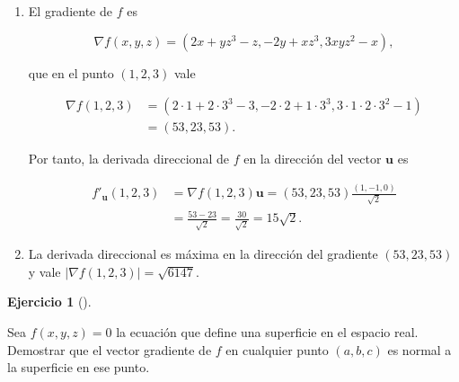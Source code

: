 \documentclass[
  spanish,
  a4paper,
]{scrreport}
\theoremstyle{definition}
\newtheorem{exercise}{Ejercicio}[chapter]
\theoremstyle{remark}
\begin{document}
\begin{tcolorbox}[enhanced jigsaw, arc=.35mm, bottomrule=.15mm, bottomtitle=1mm, breakable, colback=white, colbacktitle=quarto-callout-tip-color!10!white, colframe=quarto-callout-tip-color-frame, coltitle=black, left=2mm, leftrule=.75mm, opacityback=0, opacitybacktitle=0.6, rightrule=.15mm, title=\textcolor{quarto-callout-tip-color}{\faLightbulb}\hspace{0.5em}{Solución}, titlerule=0mm, toprule=.15mm, toptitle=1mm]

\begin{enumerate}
\def\labelenumi{\alph{enumi}.}
\item
  El gradiente de \(f\) es

  \[
  \nabla f(x,y,z) = (2x+yz^3-z, -2y+xz^3, 3xyz^2-x),
  \]

  que en el punto \((1, 2, 3)\) vale

  \begin{align*}
  \nabla f(1,2,3) 
  &= (2\cdot 1+2\cdot 3^3-3, -2\cdot 2+1\cdot 3^3, 3\cdot 1\cdot 2\cdot 3^2-1) \\
  &= (53, 23, 53).
  \end{align*}

  Por tanto, la derivada direccional de \(f\) en la dirección del vector
  \(\mathbf{u}\) es

  \begin{align*}
  f'_{\mathbf{u}}(1,2,3) 
  &= \nabla{f}(1,2,3)\mathbf{u} 
  = (53,23,53)\frac{(1,-1,0)}{\sqrt{2}} \\
  &= \frac{53-23}{\sqrt{2}} 
  = \frac{30}{\sqrt{2}}
  = 15\sqrt{2}.
  \end{align*}
\item
  La derivada direccional es máxima en la dirección del gradiente
  \((53,23,53)\) y vale \(|\nabla f(1,2,3)| = \sqrt{6147}\).
\end{enumerate}

\end{tcolorbox}

\begin{exercise}[]\protect\hypertarget{exr-vector-gradiente-normal-curvas-nivel}{}\label{exr-vector-gradiente-normal-curvas-nivel}

Sea \(f(x,y,z)=0\) la ecuación que define una superficie en el espacio
real. Demostrar que el vector gradiente de \(f\) en cualquier punto
\((a, b, c)\) es normal a la superficie en ese punto.

\end{exercise}
\end{document}
